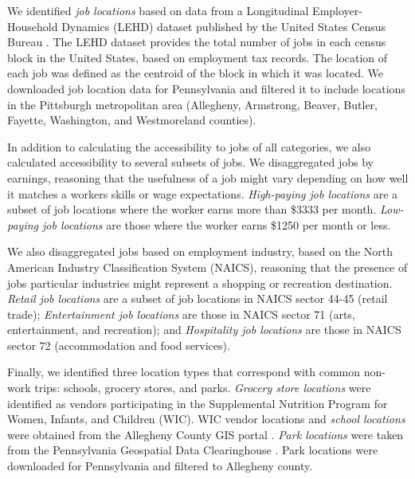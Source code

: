 \documentclass[
]{book}
\begin{document}
We identified \emph{job locations} based on data from a Longitudinal
Employer-Household Dynamics (LEHD) dataset published by the United States Census
Bureau \citep{united_states_census_bureau_lehd_2021}. The LEHD dataset provides the
total number of jobs in each census block in the United States, based on
employment tax records. The location of each job was defined as the centroid of
the block in which it was located. We downloaded job location data for
Pennsylvania and filtered it to include locations in the Pittsburgh metropolitan
area (Allegheny, Armstrong, Beaver, Butler, Fayette, Washington, and
Westmoreland counties).

In addition to calculating the accessibility to jobs of all categories, we also
calculated accessibility to several subsets of jobs. We disaggregated jobs by
earnings, reasoning that the usefulness of a job might vary depending on how
well it matches a workers skills or wage expectations. \emph{High-paying job locations}
are a subset of job locations where the worker earns more than \$3333 per month.
\emph{Low-paying job locations} are those where the worker earns \$1250 per month or less.

We also disaggregated jobs based on employment industry, based on the North
American Industry Classification System (NAICS), reasoning that the presence of
jobs particular industries might represent a shopping or recreation destination.
\emph{Retail job locations} are a subset of job locations in NAICS sector 44-45
(retail trade); \emph{Entertainment job locations} are those in NAICS sector 71
(arts, entertainment, and recreation); and \emph{Hospitality job locations} are
those in NAICS sector 72 (accommodation and food services).

Finally, we identified three location types that correspond with common non-work
trips: schools, grocery stores, and parks. \emph{Grocery store locations} were
identified as vendors participating in the Supplemental Nutrition Program for
Women, Infants, and Children (WIC). WIC vendor locations and \emph{school locations}
were obtained from the Allegheny County GIS portal
\citep{allegheny_county_office_of_information_technology_allegheny_2018, allegheny_county_office_of_information_technology_allegheny_2020}.
\emph{Park locations} were taken from the Pennsylvania Geospatial Data Clearinghouse
\citep{pennsylvania_department_of_conservation_and_natural_resources_pennsylvania_2015}.
Park locations were downloaded for Pennsylvania and filtered to Allegheny county.
\end{document}
